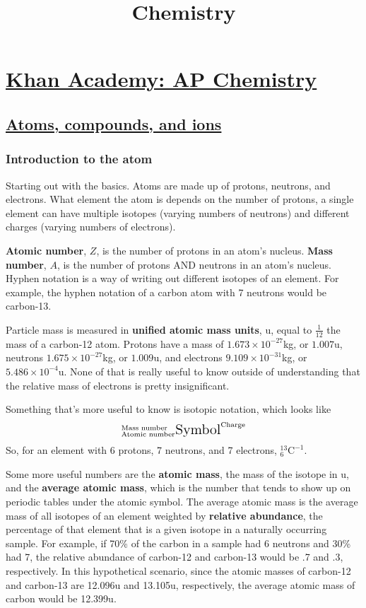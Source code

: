 \documentclass{article}
\title{Chemistry}
\begin{document}
\maketitle

\section{\href{https://www.khanacademy.org/science/ap-chemistry}{Khan Academy: AP Chemistry}}

\subsection{\href{https://www.khanacademy.org/science/ap-chemistry/atoms-compounds-ions-ap}{Atoms, compounds, and ions}}
\subsubsection{Introduction to the atom}
Starting out with the basics. Atoms are made up of protons, neutrons, and electrons. What element the atom is depends on the number of protons, a single element can have multiple isotopes (varying numbers of neutrons) and different charges (varying numbers of electrons).\par
\textbf{Atomic number}, \(Z\), is the number of protons in an atom's nucleus. \textbf{Mass number}, \(A\), is the number of protons AND neutrons in an atom's nucleus. Hyphen notation is a way of writing out different isotopes of an element. For example, the hyphen notation of a carbon atom with 7 neutrons would be carbon-13.\par
Particle mass is measured in \textbf{unified atomic mass units}, u, equal to \(\frac{1}{12}\) the mass of a carbon-12 atom. Protons have a mass of \(1.673\times10^{-27}\)kg, or \(1.007\)u, neutrons \(1.675\times10^{-27}\)kg, or \(1.009\)u, and electrons \(9.109\times10^{-31}\)kg, or \(5.486\times10^{-4}\)u. None of that is really useful to know outside of understanding that the relative mass of electrons is pretty insignificant.\par
Something that's more useful to know is isotopic notation, which looks like \[^{\text{Mass number}}_{\text{Atomic number}}\text{\Large{Symbol}}^{\text{Charge}}\] So, for an element with 6 protons, 7 neutrons, and 7 electrons, \(^{13}_{6}\text{C}^{-1}\).\par
Some more useful numbers are the \textbf{atomic mass}, the mass of the isotope in u, and the \textbf{average atomic mass}, which is the number that tends to show up on periodic tables under the atomic symbol. The average atomic mass is the average mass of all isotopes of an element weighted by \textbf{relative abundance}, the percentage of that element that is a given isotope in a naturally occurring sample. For example, if 70\% of the carbon in a sample had 6 neutrons and 30\% had 7, the relative abundance of carbon-12 and carbon-13 would be .7 and .3, respectively. In this hypothetical scenario, since the atomic masses of carbon-12 and carbon-13 are 12.096u and 13.105u, respectively, the average atomic mass of carbon would be 12.399u.\par
\end{document}
